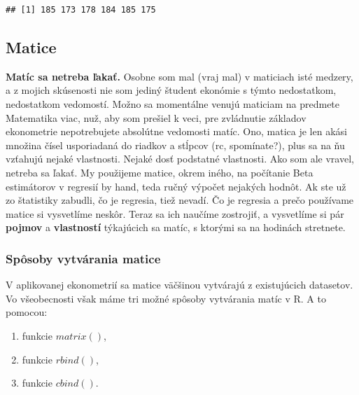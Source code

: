 \begin{verbatim}
## [1] 185 173 178 184 185 175
\end{verbatim}

\hypertarget{matice}{%
\subsection{Matice}\label{matice}}

\textbf{Matíc sa netreba ľakať.} Osobne som mal (vraj mal) v maticiach
isté medzery, a z mojich skúsenosti nie som jediný študent ekonómie s
týmto nedostatkom, nedostatkom vedomostí. Možno sa momentálne venujú
maticiam na predmete Matematika viac, nuž, aby som prešiel k veci, pre
zvládnutie základov ekonometrie nepotrebujete absolútne vedomosti matíc.
Ono, matica je len akási množina čísel usporiadaná do riadkov a stĺpcov
(rc, spomínate?), plus sa na ňu vzťahujú nejaké vlastnosti. Nejaké dosť
podstatné vlastnosti. Ako som ale vravel, netreba sa ľakať. My použijeme
matice, okrem iného, na počítanie Beta estimátorov v regresií by hand,
teda ručný výpočet nejakých hodnôt. Ak ste už zo štatistiky zabudli, čo
je regresia, tiež nevadí. Čo je regresia a prečo používame matice si
vysvetlíme neskôr. Teraz sa ich naučíme zostrojiť, a vysvetlíme si pár
\textbf{pojmov} a \textbf{vlastností} týkajúcich sa matíc, s ktorými sa
na hodinách stretnete.

\hypertarget{spuxf4soby-vytvuxe1rania-matice}{%
\subsubsection{Spôsoby vytvárania
matice}\label{spuxf4soby-vytvuxe1rania-matice}}

V aplikovanej ekonometrií sa matice väčšinou vytvárajú z existujúcich
datasetov. Vo všeobecnosti však máme tri možné spôsoby vytvárania matíc
v R. A to pomocou:

\begin{enumerate}
\def\labelenumi{\arabic{enumi}.}
\tightlist
\item
  funkcie \(matrix()\),
\item
  funkcie \(rbind()\),
\item
  funkcie \(cbind()\).
\end{enumerate}

